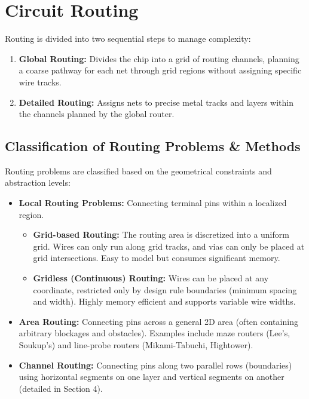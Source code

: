 \documentclass[12pt,a4paper]{article}
\begin{document}
\section{Circuit Routing}

Routing is divided into two sequential steps to manage complexity:
\begin{enumerate}[leftmargin=*, itemsep=2pt]
  \item \textbf{Global Routing:} Divides the chip into a grid of routing channels, planning a coarse pathway for each net through grid regions without assigning specific wire tracks.
  \item \textbf{Detailed Routing:} Assigns nets to precise metal tracks and layers within the channels planned by the global router.
\end{enumerate}

\subsection{Classification of Routing Problems \& Methods}
Routing problems are classified based on the geometrical constraints and abstraction levels:
\begin{itemize}[leftmargin=*, itemsep=3pt]
  \item \textbf{Local Routing Problems:} Connecting terminal pins within a localized region.
        \begin{itemize}[leftmargin=*, label=$\bullet$, itemsep=1pt]
          \item \textbf{Grid-based Routing:} The routing area is discretized into a uniform grid. Wires can only run along grid tracks, and vias can only be placed at grid intersections. Easy to model but consumes significant memory.
          \item \textbf{Gridless (Continuous) Routing:} Wires can be placed at any coordinate, restricted only by design rule boundaries (minimum spacing and width). Highly memory efficient and supports variable wire widths.
        \end{itemize}
  \item \textbf{Area Routing:} Connecting pins across a general 2D area (often containing arbitrary blockages and obstacles). Examples include maze routers (Lee's, Soukup's) and line-probe routers (Mikami-Tabuchi, Hightower).
  \item \textbf{Channel Routing:} Connecting pins along two parallel rows (boundaries) using horizontal segments on one layer and vertical segments on another (detailed in Section 4).
\end{itemize}
\end{document}
